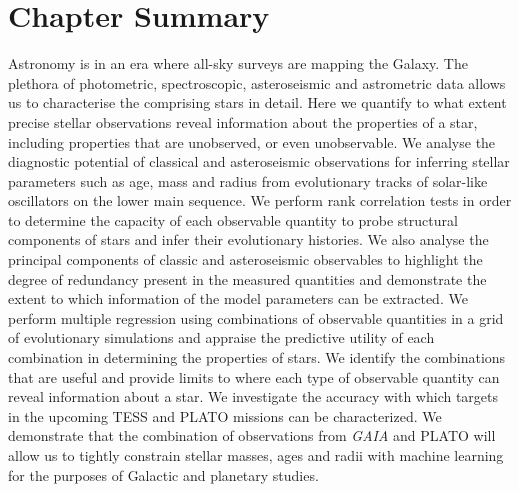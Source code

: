 


\section*{Chapter Summary}
Astronomy is in an era where all-sky surveys are mapping the Galaxy. 
The plethora of photometric, spectroscopic, asteroseismic and astrometric data allows us to characterise the comprising stars in detail.  
Here we quantify to what extent precise stellar observations reveal information about the properties of a star, including properties that are unobserved, or even unobservable. 
We analyse the diagnostic potential of classical and asteroseismic observations for inferring stellar parameters such as age, mass and radius from evolutionary tracks of solar-like oscillators on the lower main sequence. 
We perform rank correlation tests in order to determine the capacity of each observable quantity to probe structural components of stars and infer their evolutionary histories. We also analyse the principal components of classic and asteroseismic observables to highlight the degree of redundancy present in the measured quantities and demonstrate the extent to which information of the model parameters can be extracted.
We perform multiple regression using combinations of observable quantities in a grid of evolutionary simulations and appraise the predictive utility of each combination in determining the properties of stars.
We identify the combinations that are useful and provide limits to where each type of observable quantity can reveal information about a star. We investigate the accuracy with which targets in the upcoming TESS and PLATO missions can be characterized.  We demonstrate that the combination of observations from \emph{GAIA} and PLATO will allow us to tightly constrain stellar masses, ages and radii with machine learning for the purposes of Galactic and planetary studies.

